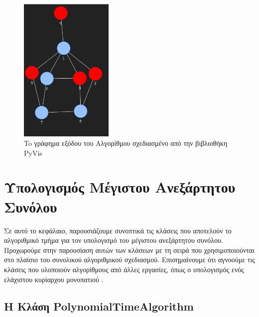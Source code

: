

\begin{figure}[H]
	\centering
	\includegraphics[width=0.4\textwidth]{pictures/at-free-graph-ind-output-pyvis.png} 
	\caption{To γράφημα εξόδου του Αλγορίθμου σχεδιασμένο από την βιβλιοθήκη PyVis}
	\label{fig:at-free-graph-ind-output-pyvis}
\end{figure}


\section{Υπολογισμός Μέγιστου Ανεξάρτητου Συνόλου}
\label{sec:Impl-Independent-set}


Σε αυτό το κεφάλαιο, παρουσιάζουμε συνοπτικά τις κλάσεις που αποτελούν το αλγοριθμικό τμήμα για τον υπολογισμό του μέγιστου ανεξάρτητου συνόλου. Προχωρούμε στην παρουσίαση αυτών των κλάσεων με τη σειρά που χρησιμοποιούνται στο πλαίσιο του συνολικού αλγοριθμικού σχεδιασμού. Επισημαίνουμε ότι αγνοούμε τις κλάσεις που υλοποιούν αλγορίθμους από άλλες εργασίες, όπως ο υπολογισμός ενός ελάχιστου κυρίαρχου μονοπατιού \cite{corneil-olariu-stewart-asteroidal-triple-free-graphs}.



\subsection{H Kλάση PolynomialTimeAlgorithm}



